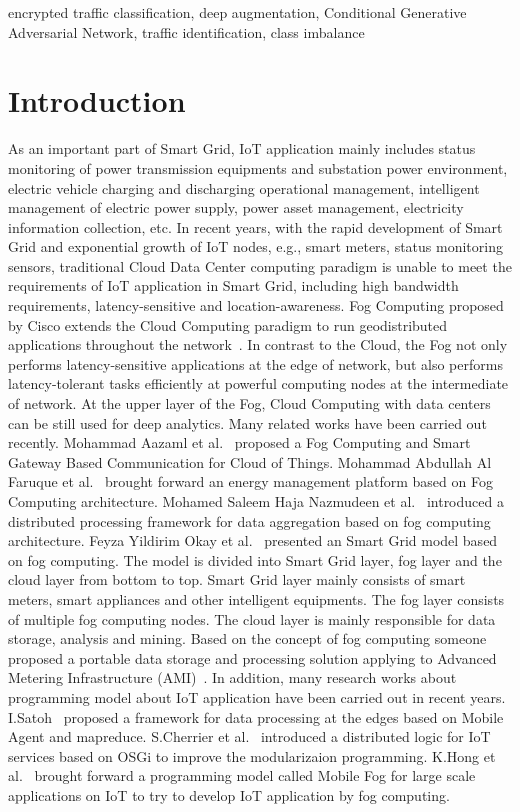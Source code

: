 \documentclass[conference]{IEEEtran}
\begin{document}
\begin{IEEEkeywords}
encrypted traffic classification, deep augmentation, Conditional Generative Adversarial Network, traffic identification, class imbalance
\end{IEEEkeywords}


\section{Introduction}\label{sec:intro} %
As an important part of Smart Grid, IoT application mainly includes status monitoring of power transmission equipments and substation power environment, electric vehicle charging and discharging operational management, intelligent management of electric power supply, power asset management, electricity information collection, etc. In recent years, with the rapid development of Smart Grid and exponential growth of IoT nodes, e.g., smart meters, status monitoring sensors, traditional Cloud Data Center computing paradigm is unable to meet the requirements of IoT application in Smart Grid, including high bandwidth requirements, latency-sensitive and location-awareness. Fog Computing proposed by Cisco extends the Cloud Computing paradigm to run geodistributed applications throughout the network~\cite{bonomi2012}. In contrast to the Cloud, the Fog not only performs latency-sensitive applications at the edge of
network, but also performs latency-tolerant tasks efficiently at
powerful computing nodes at the intermediate of network. At
the upper layer of the Fog, Cloud Computing with data centers can be
still used for deep analytics.
Many related works have been carried out recently. Mohammad Aazaml et al.~\cite{Aazam2014gateway} proposed a Fog Computing and Smart Gateway Based Communication for Cloud of Things.   Mohammad Abdullah Al Faruque et al.~\cite{Faruque2016energy} brought forward an energy management platform based on Fog Computing architecture. Mohamed Saleem Haja Nazmudeen et al.~\cite{Nazmudeen2016PLC} introduced a distributed processing framework for data aggregation based on fog computing architecture. Feyza Yildirim Okay et al.~\cite{Okay2016smartgrid} presented an Smart Grid model based on fog computing. The model is divided into Smart  Grid layer, fog layer and the cloud layer from bottom to top. Smart Grid layer mainly consists of smart meters, smart appliances and other intelligent equipments. The fog layer consists of multiple fog computing nodes. The cloud layer is mainly responsible for data storage, analysis and mining. Based on the concept of fog computing someone proposed a portable data storage and processing solution applying to Advanced Metering Infrastructure (AMI)~\cite{Yan2016AMI}. In addition, many research works about programming model about IoT application have been carried out in recent years. I.Satoh~\cite{Satoh2013} proposed a framework for data processing at the edges based on Mobile Agent and mapreduce. S.Cherrier et al.~\cite{Cherrier2011} introduced a distributed logic for IoT services based on OSGi to improve the modularizaion programming. K.Hong et al.~\cite{Hong2013} brought forward a programming model called Mobile Fog for large scale applications on IoT to try to develop IoT application by fog computing.
\end{document}
